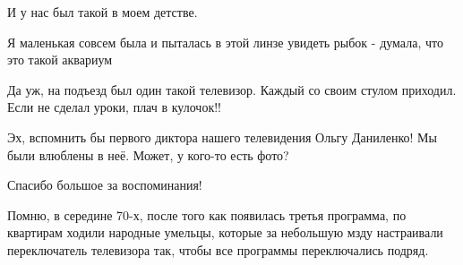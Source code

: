 \begin{itemize}

И у нас был такой в моем детстве.


Я маленькая совсем была и пыталась в этой линзе увидеть рыбок - думала, что это
такой аквариум


Да уж, на подъезд был один такой телевизор.
Каждый со своим стулом приходил.
Если не сделал уроки, плач в кулочок!!


Эх, вспомнить бы первого диктора нашего телевидения Ольгу Даниленко! Мы были
влюблены в неё. Может, у кого-то есть фото?


Спасибо большое за воспоминания!

Помню, в середине 70-х, после того как появилась третья программа, по квартирам
ходили народные умельцы, которые за небольшую мзду настраивали переключатель
телевизора так, чтобы все программы переключались подряд.

\end{itemize} %
